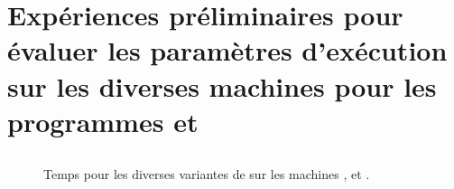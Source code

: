 
\chapter{Expériences préliminaires pour évaluer les paramètres
d'exécution sur les diverses machines pour les programmes
 et }

\section{}

\label{wordcount-java.ann}


\begin{figure}

\caption{Temps pour les diverses variantes de  sur
les machines ,  et .}
\label{preliminaires-wordcount-java.fig}
\end{figure}



\newpage
\section{}

\label{stockprice-java.ann}
